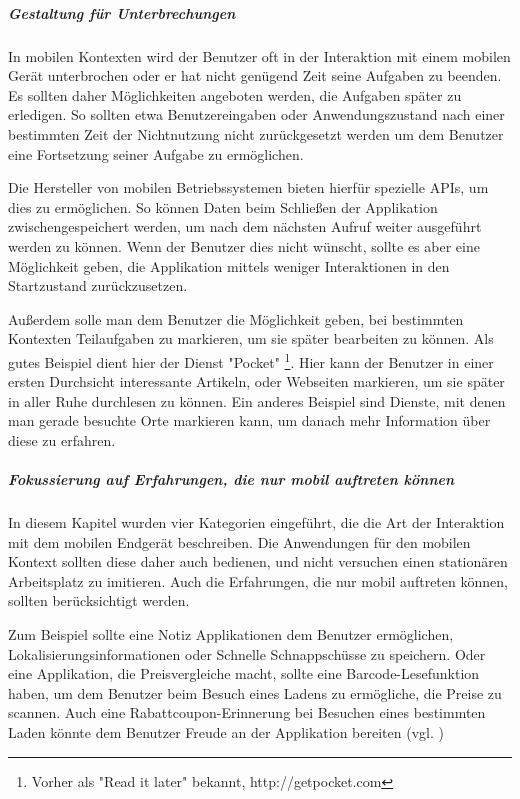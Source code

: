 \subparagraph{Gestaltung für Unterbrechungen}
\label{subp:erm_gliche_eine_fortsetzung}

In mobilen Kontexten wird der Benutzer oft in der Interaktion mit einem mobilen Gerät unterbrochen oder er hat nicht genügend Zeit seine Aufgaben zu beenden. Es sollten daher Möglichkeiten angeboten werden, die Aufgaben später zu erledigen. So sollten etwa Benutzereingaben oder Anwendungszustand nach einer bestimmten Zeit der Nichtnutzung nicht zurückgesetzt werden um dem Benutzer eine Fortsetzung seiner Aufgabe zu ermöglichen.

Die Hersteller von mobilen Betriebssystemen bieten hierfür spezielle APIs, um dies zu ermöglichen. So können Daten beim Schließen der Applikation zwischengespeichert werden, um nach dem nächsten Aufruf  weiter ausgeführt werden zu können. Wenn der Benutzer dies nicht wünscht, sollte es aber eine Möglichkeit geben, die Applikation mittels weniger Interaktionen in den Startzustand zurückzusetzen.

Außerdem solle man dem Benutzer die Möglichkeit geben, bei bestimmten Kontexten Teilaufgaben zu markieren, um sie später bearbeiten zu können. Als gutes Beispiel dient hier der Dienst "Pocket" \footnote{Vorher als "Read it later" bekannt, http://getpocket.com }. Hier kann der Benutzer in einer ersten Durchsicht interessante Artikeln, oder Webseiten markieren, um sie später in aller Ruhe durchlesen zu können. Ein anderes Beispiel sind Dienste, mit denen man gerade besuchte Orte markieren kann, um danach mehr Information über diese zu erfahren.

\subparagraph{Fokussierung auf Erfahrungen, die nur mobil auftreten können} %
\label{subp:fokussiere_auf_erfahrungen_die_nur_mobil_auftreten_k_nnen}

In diesem Kapitel wurden vier Kategorien eingeführt, die die Art der Interaktion mit dem mobilen Endgerät beschreiben. Die Anwendungen für den mobilen Kontext sollten diese daher auch bedienen, und nicht versuchen einen stationären Arbeitsplatz zu imitieren. Auch die Erfahrungen, die nur mobil auftreten können, sollten berücksichtigt werden. 

Zum Beispiel sollte eine Notiz Applikationen dem Benutzer ermöglichen, Lokalisierungsinformationen oder Schnelle Schnappschüsse zu speichern. Oder eine Applikation, die Preisvergleiche macht, sollte eine Barcode-Lesefunktion haben, um dem Benutzer beim Besuch eines Ladens zu ermögliche, die Preise zu scannen.  Auch eine Rabattcoupon-Erinnerung bei Besuchen eines bestimmten Laden könnte dem Benutzer Freude an der Applikation bereiten (vgl. \cite{smartOnline})
\newline

